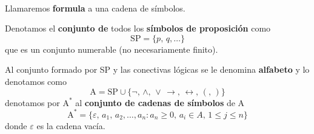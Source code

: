 \paragraph{}
\begin{definition} Llamaremos \textbf{formula} a una cadena de símbolos.
\end{definition}

\begin{definition} Denotamos el \textbf{conjunto de} todos los \textbf{símbolos de proposición} como 
	\[ \mbox{SP}=\{p, \, q, \ldots \} \]
	que es un conjunto numerable (no necesariamente finito). 
\end{definition}

\begin{definition} Al conjunto formado por SP y las conectivas lógicas se le denomina \textbf{alfabeto} y lo denotamos como 
	\[ \mbox{A}= \mbox{SP} \cup \{ \lnot, \, \wedge, \, \lor \, \rightarrow, \, \leftrightarrow, \, (, \, ) \} \]
	denotamos por $\mbox{A}^*$ al \textbf{conjunto de cadenas de símbolos} de A
	\[ \mbox{A}^*=\{ \varepsilon, \, a_1, \, a_2, \ldots , a_n : a_n \geq 0,\, a_i \in A,\, 1 \leq j \leq n   \} \]
	donde $\varepsilon$ es la cadena vacía. 
\end{definition}

